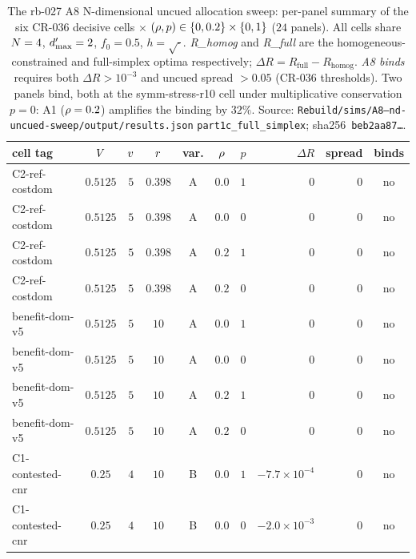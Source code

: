 \begin{table}[t]
  \centering
  \small
  \caption{The rb-027 A8 N-dimensional uncued allocation sweep:
    per-panel summary of the six CR-036 decisive cells $\times$
    $(\rho, p) \in \{0, 0.2\} \times \{0, 1\}$ ($24$ panels). All cells
    share $N = 4$, $d'_{\max} = 2$, $f_0 = 0.5$, $h = \sqrt{\cdot}$.
    \emph{R\_homog} and \emph{R\_full} are the homogeneous-constrained and
    full-simplex optima respectively; $\Delta R = R_{\mathrm{full}} -
    R_{\mathrm{homog}}$. \emph{A8 binds} requires both $\Delta R > 10^{-3}$
    and uncued spread $> 0.05$ (CR-036 thresholds). Two panels bind, both
    at the symm-stress-r10 cell under multiplicative conservation $p = 0$:
    A1 ($\rho = 0.2$) amplifies the binding by $32\%$. Source:
    \texttt{Rebuild/sims/A8--nd-uncued-sweep/}\allowbreak\texttt{output/results.json}
    \texttt{part1c\_full\_simplex}; sha256~\texttt{beb2aa87\ldots}.}
  \label{tab:a8-rb027-summary}
  \begin{tabular}{l c c c c c r r r c}
    \toprule
    cell tag & $V$ & $v$ & $r$ & var. & $\rho$ & $p$
      & $\Delta R$ & spread & binds \\
    \midrule
    C2-ref-costdom    & $0.5125$ & $5$ & $0.398$ & A & $0.0$ & $1$
      & $0$ & $0$ & no \\
    C2-ref-costdom    & $0.5125$ & $5$ & $0.398$ & A & $0.0$ & $0$
      & $0$ & $0$ & no \\
    C2-ref-costdom    & $0.5125$ & $5$ & $0.398$ & A & $0.2$ & $1$
      & $0$ & $0$ & no \\
    C2-ref-costdom    & $0.5125$ & $5$ & $0.398$ & A & $0.2$ & $0$
      & $0$ & $0$ & no \\
    \addlinespace
    benefit-dom-v5    & $0.5125$ & $5$ & $10$    & A & $0.0$ & $1$
      & $0$ & $0$ & no \\
    benefit-dom-v5    & $0.5125$ & $5$ & $10$    & A & $0.0$ & $0$
      & $0$ & $0$ & no \\
    benefit-dom-v5    & $0.5125$ & $5$ & $10$    & A & $0.2$ & $1$
      & $0$ & $0$ & no \\
    benefit-dom-v5    & $0.5125$ & $5$ & $10$    & A & $0.2$ & $0$
      & $0$ & $0$ & no \\
    \addlinespace
    C1-contested-cnr  & $0.25$   & $4$ & $10$    & B & $0.0$ & $1$
      & $-7.7\!\times\!10^{-4}$ & $0$ & no \\
    C1-contested-cnr  & $0.25$   & $4$ & $10$    & B & $0.0$ & $0$
      & $-2.0\!\times\!10^{-3}$ & $0$ & no \\

\end{tabular}
\end{table}
